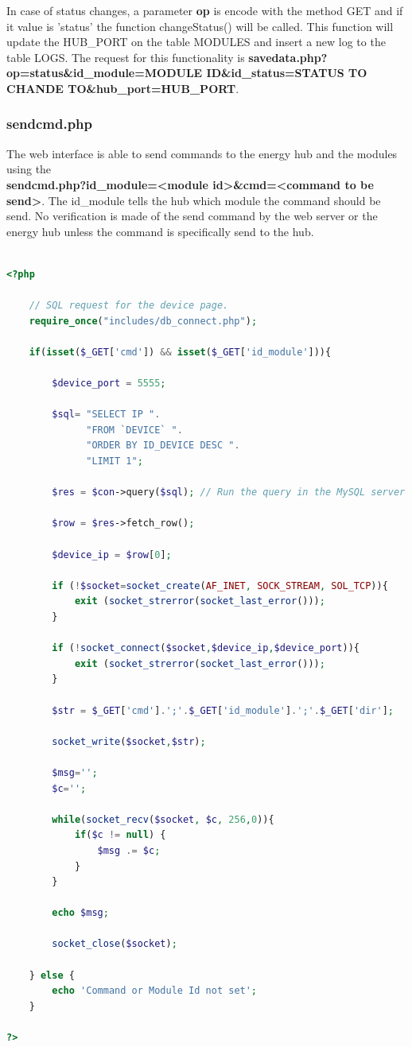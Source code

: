 In case of status changes, a parameter \textbf{op} is encode with the method GET and if it value is 'status' the function changeStatus() will be called. This function will update the HUB\_PORT on the table MODULES and insert a new log to the table LOGS. The request for this functionality is  \textbf{savedata.php?op=status\&id\_module=MODULE ID\&id\_status=STATUS TO CHANDE TO\&hub\_port=HUB\_PORT}.

\subsubsection{sendcmd.php}

The web interface is able to send commands to the energy hub and the modules using the\\ \textbf{sendcmd.php?id\_module=\textless module id\textgreater\&cmd=\textless command to be send\textgreater }. The id\_module tells the hub which module the command should be send.
No verification is made of the send command by the web server or the energy hub unless the command is specifically send to the hub.

\begin{lstlisting}[language=php]

<?php
	
	// SQL request for the device page.
	require_once("includes/db_connect.php");
	
	if(isset($_GET['cmd']) && isset($_GET['id_module'])){
		
		$device_port = 5555;
			
		$sql= "SELECT IP ". 
			  "FROM `DEVICE` ". 
			  "ORDER BY ID_DEVICE DESC ".
			  "LIMIT 1";
		
		$res = $con->query($sql); // Run the query in the MySQL server
		
		$row = $res->fetch_row();
		
		$device_ip = $row[0];
		
		if (!$socket=socket_create(AF_INET, SOCK_STREAM, SOL_TCP)){
			exit (socket_strerror(socket_last_error()));
		}
	
		if (!socket_connect($socket,$device_ip,$device_port)){
			exit (socket_strerror(socket_last_error()));
		}
	
		$str = $_GET['cmd'].';'.$_GET['id_module'].';'.$_GET['dir'];
		
		socket_write($socket,$str);
	
		$msg='';
		$c='';
    	
		while(socket_recv($socket, $c, 256,0)){
  			if($c != null) {
   				$msg .= $c;
			}
		}
		
		echo $msg;
        
		socket_close($socket);
		
	} else {
		echo 'Command or Module Id not set';
	}

?>
\end{lstlisting}

